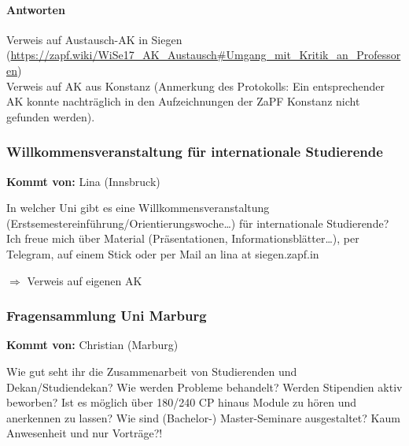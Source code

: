       \paragraph{Antworten}
        Verweis auf Austausch-AK in Siegen (\url{https://zapf.wiki/WiSe17_AK_Austausch#Umgang_mit_Kritik_an_Professoren}) \\
        Verweis auf AK aus Konstanz (Anmerkung des Protokolls: Ein entsprechender AK konnte nachträglich in den Aufzeichnungen der ZaPF Konstanz nicht gefunden werden).

    \subsubsection*{Willkommensveranstaltung für internationale Studierende}
      \textbf{Kommt von:} Lina (Innsbruck)

In welcher Uni gibt es eine Willkommensveranstaltung (Erstsemestereinführung/Orientierungswoche…) für internationale Studierende?
Ich freue mich über Material (Präsentationen, Informationsblätter…), per Telegram, auf einem Stick oder per Mail an lina at siegen.zapf.in

    $\Rightarrow$ Verweis auf eigenen AK

    \subsubsection*{Fragensammlung Uni Marburg}
      \textbf{Kommt von:} Christian (Marburg)
        \begin{itemize}
Wie gut seht ihr die Zusammenarbeit von Studierenden und Dekan/Studiendekan? Wie werden Probleme behandelt?
Werden Stipendien aktiv beworben?
Ist es möglich über 180/240 CP hinaus Module zu hören und anerkennen zu lassen?
Wie sind (Bachelor-) Master-Seminare ausgestaltet? Kaum Anwesenheit und nur Vorträge?!
        \end{itemize}


